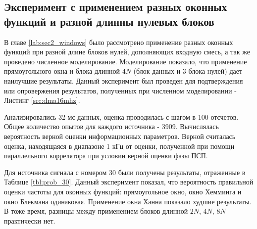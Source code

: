 {\begin{tabular}{ | c | c | c | c |}
	\end{tabular}%
} 

\subsection{Эксперимент с применением разных оконных функций и разной длинны нулевых блоков}

В главе \ref{lab:sec2_windows} было рассмотрено применение разных оконных функций при разной длине блоков нулей, дополняющих входную смесь, а так же проведено численное моделирование.
Моделирование показало, что применение прямоугольного окна и блока длинной ${4N}$ (блок данных и 3 блока нулей) дает наилучшие результаты. Данный эксперимент был проведен для
подтверждения или опровержения результатов, полученных при численном моделировании - Листинг \ref{src:dma16mhz}.

Анализировались 32 мс данных, оценка проводилась с шагом в 100 отсчетов. Общее количество опытов для каждого источника - 3909. Вычислялась вероятность верной оценки информационных параметров.
Верной считалась оценка, находящаяся в диапазоне 1 кГц от оценки, полученной при помощи параллельного коррелятора при условии верной оценки фазы ПСП.

Для источника сигнала с номером 30 были получены результаты, отраженные в Таблице \ref{tbl:prob_30}. Данный эксперимент показал, что вероятность правильной оценки частоты для
оконных функций: прямоугольное окно, окно Хемминга и окно Блекмана одинаковая. Применение окна Ханна показало худшие результаты. В тоже время, разницы между применением блоков длинной ${2N}$,
${4N}$, ${8N}$ практически нет.


